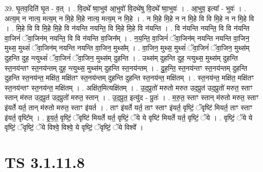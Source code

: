 \documentclass[17pt]{extarticle}
\begin{document}
39. घृ॒तव॒दिति॑ घृ॒त - व॒त् । . वि॒दथे᳚ ष्वा॒भुव॑ आ॒भुवो॑ वि॒दथे॑षु वि॒दथे᳚ ष्वा॒भुवः॑ । . आ॒भुव॒ इत्या᳚ - भुवः॑ । . अत्य॒म् न नात्य॒ मत्य॒म् न मि॒हे मि॒हे नात्य॒ मत्य॒म् न मि॒हे । . न मि॒हे मि॒हे न न मि॒हे वि वि मि॒हे न न मि॒हे वि । . मि॒हे वि वि मि॒हे मि॒हे वि न॑यन्ति नयन्ति॒ वि मि॒हे मि॒हे वि न॑यन्ति । . वि न॑यन्ति नयन्ति॒ वि वि न॑यन्ति वा॒जिनं॑ ॅवा॒जिन॑म् नयन्ति॒ वि वि न॑यन्ति वा॒जिन᳚म् । . न॒य॒न्ति॒ वा॒जिनं॑ ॅवा॒जिन॑म् नयन्ति नयन्ति वा॒जिन॒ मुथ्स॒ मुथ्सं॑ ॅवा॒जिन॑म् नयन्ति नयन्ति वा॒जिन॒ मुथ्स᳚म् । . वा॒जिन॒ मुथ्स॒ मुथ्सं॑ ॅवा॒जिनं॑ ॅवा॒जिन॒ मुथ्स॑म् दुहन्ति दुह॒ न्त्युथ्सं॑ ॅवा॒जिनं॑ ॅवा॒जिन॒ मुथ्स॑म् दुहन्ति । . उथ्स॑म् दुहन्ति दुह॒ न्त्युथ्स॒ मुथ्स॑म् दुहन्ति स्त॒नय॑न्तꣳ स्त॒नय॑न्तम् दुह॒ न्त्युथ्स॒ मुथ्स॑म् दुहन्ति स्त॒नय॑न्तम् । . दु॒ह॒न्ति॒ स्त॒नय॑न्तꣳ स्त॒नय॑न्तम् दुहन्ति दुहन्ति स्त॒नय॑न्त॒ मक्षि॑त॒ मक्षि॑तꣳ स्त॒नय॑न्तम् दुहन्ति दुहन्ति स्त॒नय॑न्त॒ मक्षि॑तम् । . स्त॒नय॑न्त॒ मक्षि॑त॒ मक्षि॑तꣳ स्त॒नय॑न्तꣳ स्त॒नय॑न्त॒ मक्षि॑तम् । . अक्षि॑त॒मित्यक्षि॑तम् । . उ॒द॒प्रुतो॑ मरुतो मरुत उद॒प्रुत॑ उद॒प्रुतो॑ मरुत॒ स्ताꣳ स्तान् म॑रुत उद॒प्रुत॑ उद॒प्रुतो॑ मरुत॒ स्तान् । . उ॒द॒प्रुत॒ इत्यु॑द - प्रुतः॑ । . म॒रु॒त॒ स्ताꣳ स्तान् म॑रुतो मरुत॒ स्ताꣳ इ॑यर्ते यर्त॒ तान् म॑रुतो मरुत॒ स्ताꣳ इ॑यर्त । . ताꣳ इ॑यर्ते यर्त॒ ताꣳ स्ताꣳ इ॑यर्त॒ वृष्टिं॒ ॅवृष्टि॑ मियर्त॒ ताꣳ स्ताꣳ इ॑यर्त॒ वृष्टि᳚म् । . इ॒य॒र्त॒ वृष्टिं॒ ॅवृष्टि॑ मियर्ते यर्त॒ वृष्टिं॒ ॅये ये वृष्टि॑ मियर्ते यर्त॒ वृष्टिं॒ ॅये । . वृष्टिं॒ ॅये ये वृष्टिं॒ ॅवृष्टिं॒ ॅये विश्वे॒ विश्वे॒ ये वृष्टिं॒ ॅवृष्टिं॒ ॅये विश्वे᳚ । \newline
\pagebreak
{}

\section{ TS 3.1.11.8 }
\end{document}
